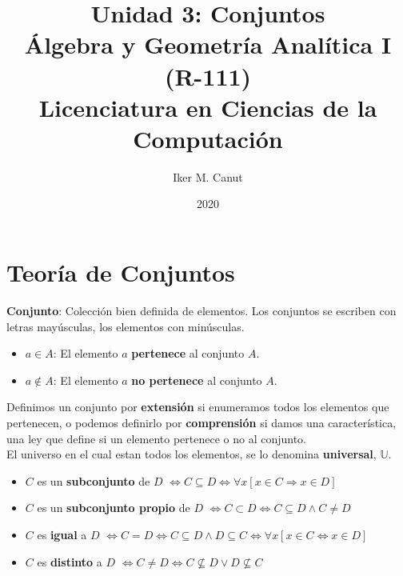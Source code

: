 \documentclass[11pt,a4paper]{article}
\author{Iker M. Canut}
\title{Unidad 3: Conjuntos\\\'Algebra y Geometr\'ia Anal\'itica I (R-111)\\Licenciatura en Ciencias de la Computaci\'on}
\date{2020}
\begin{document}
\maketitle
\newpage
\section{Teor\'ia de Conjuntos}
\noindent \textbf{Conjunto}: Colecci\'on bien definida de elementos. Los conjuntos se escriben con letras may\'usculas, los elementos con min\'usculas.
\begin{itemize}
\item $a \in A$: El elemento $a$ \textbf{pertenece} al conjunto $A$.
\item $a \not \in A$: El elemento $a$ \textbf{no pertenece} al conjunto $A$.
\end{itemize}
\noindent Definimos un conjunto por \textbf{extensi\'on} si enumeramos todos los elementos que pertenecen, o podemos definirlo por \textbf{comprensi\'on} si damos una caracter\'istica, una ley que define si un elemento pertenece o no al conjunto. \\ \noindent El universo en el cual estan todos los elementos, se lo denomina \textbf{universal}, $\mathbb{U}$.\\

\begin{itemize}
\item $C$ es un \textbf{subconjunto} de $D$ $\iff C \subseteq D \iff \forall x[x \in C \Rightarrow x \in D]$

\item $C$ es un \textbf{subconjunto propio} de $D$ $\iff C \subset D \iff C \subseteq D \land C \not = D$

\item $C$ es \textbf{igual} a $D$ $\iff C = D \iff C \subseteq D \land D \subseteq C \iff \forall x[x \in C \iff x \in D]$
\item $C$ es \textbf{distinto} a $D$ $\iff C \not = D \iff C \not \subseteq D \lor D \not \subseteq C$\\
\end{itemize}
\end{document}
